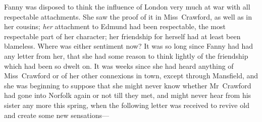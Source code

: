 Fanny was disposed to think the influence of London very much at war with all respectable attachments. She saw the proof of it in Miss~Crawford, as well as in her cousins; \textit{her}  attachment to Edmund had been respectable, the most respectable part of her character; her friendship for herself had at least been blameless. Where was either sentiment now? It was so long since Fanny had had any letter from her, that she had some reason to think lightly of the friendship which had been so dwelt on. It was weeks since she had heard anything of Miss~Crawford or of her other connexions in town, except through Mansfield, and she was beginning to suppose that she might never know whether Mr~Crawford had gone into Norfolk again or not till they met, and might never hear from his sister any more this spring, when the following letter was received to revive old and create some new sensations—

